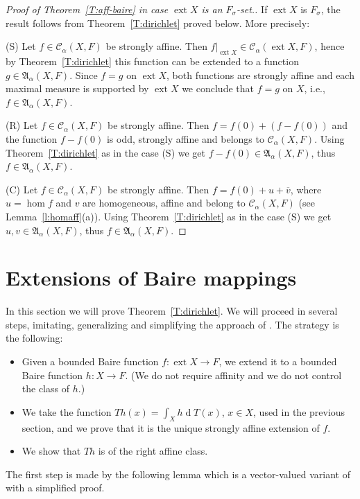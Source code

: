 \documentclass{amsart}
\numberwithin{equation}{section}
\theoremstyle{definition}
\def\fra{\mathfrak{A}}
\def\C{\mathcal C}
\def\r{|}
\def\ov{\overline}
\def \ext {\operatorname{ext}}
\def\hom{\operatorname{hom}}
\def\dd{\operatorname{d}}
\begin{document}
\begin{proof}[Proof of Theorem~\ref{T:aff-baire} in case $\ext X$ is an $F_\sigma$-set.]
If $\ext X$ is $F_\sigma$, the result follows from Theorem~\ref{T:dirichlet} proved below. More precisely:

(S) Let $f\in\C_\alpha(X,F)$ be strongly affine. Then $f\r_{\ext X}\in\C_\alpha(\ext X,F)$, hence by Theorem~\ref{T:dirichlet} this function can be extended to a function $g\in\fra_\alpha(X,F)$. Since $f=g$ on $\ext X$, both functions are strongly affine and each maximal measure is supported by $\ext X$ we conclude that $f=g$ on $X$, i.e., $f\in\fra_\alpha(X,F)$.

(R) Let $f\in\C_\alpha(X,F)$ be strongly affine. Then $f=f(0)+(f-f(0))$ and the function $f-f(0)$ is odd, strongly affine and belongs to $\C_\alpha(X,F)$. Using Theorem~\ref{T:dirichlet} as in the case (S) we get $f-f(0)\in\fra_\alpha(X,F)$, thus $f\in\fra_\alpha(X,F)$.

(C) Let $f\in\C_\alpha(X,F)$ be strongly affine. Then $f=f(0)+u+\ov{v}$, where $u=\hom f$ and $v$ are homogeneous, affine and belong to $\C_\alpha(X,F)$ (see Lemma~\ref{l:homaff}(a)).
Using Theorem~\ref{T:dirichlet} as in the case (S) we get $u,v\in\fra_\alpha(X,F)$, thus $f\in\fra_\alpha(X,F)$.
\end{proof}




\section{Extensions of Baire mappings}\label{Sec:dirichlet}

In this section we will prove Theorem~\ref{T:dirichlet}. We will proceed in several steps, imitating, generalizing and simplifying the approach of \cite{lusp23}. The strategy is the following:
\begin{itemize}
	\item Given a bounded Baire function $f\colon\ext X\to F$, we extend it to a bounded Baire function $h:X\to F$.
	(We do not require affinity and we do not control the class of $h$.)
	\item We take the function $Th(x)=\int_X h\dd T(x)$, $x\in X$, used in the previous section, and we prove that it is the unique strongly affine extension of $f$.
	\item We show that $Th$ is of the right affine class.
\end{itemize}

The first step is made by the following lemma which is a vector-valued variant of \cite[Lemma 2.8]{lusp23}
with a simplified proof.
\end{document}
